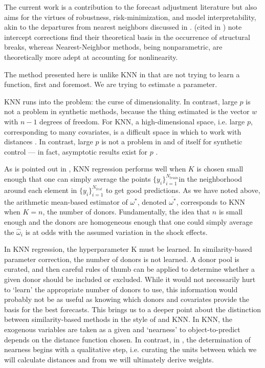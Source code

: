 \documentclass[11pt,3p,review,authoryear]{elsarticle}
\theoremstyle{definition}
\begin{document}
The current work is a contribution to the forecast adjustment literature but also aims for the virtues of robustness, risk-minimization, and model interpretability, akin to the departures from nearest neighbors discussed in \cite{abadie2021penalized}.  \cite{clements1996intercept} (cited in \cite{guerron2017macroeconomic})  note intercept corrections find their theoretical basis in the occurrence of structural breaks, whereas Nearest-Neighbor methods, being nonparametric, are theoretically more adept at accounting for nonlinearity.  

The method presented here is unlike KNN in that are not trying to learn a function, first and foremost.  We are trying to estimate a parameter.

KNN runs into the problem: the curse of dimensionality.  In contrast, large $p$ is not a problem in synthetic methods, because the thing estimated is the vector $w$ with $n-1$ degrees of freedom.  For KNN, a high-dimensional space, i.e. large $p$, corresponding to many covariates, is a difficult space in which to work with distances \citep{hastie2009elements}.  In contrast, large $p$ is not a problem in and of itself for synthetic control --- in fact, asymptotic results exist for $p$ \citep{abadie2010synthetic}.  

As is pointed out in \citet{hastie2009elements}, KNN regression performs well when $K$ is chosen small enough that one can simply average the points $\{y_{i}\}_{i=1}^{N_{train}}$in the neighborhood around each element in $\{y_{i}\}_{i=1}^{N_{test}}$ to get good predictions.  As we have noted above, the arithmetic mean-based estimator of $\omega^{*}$, denoted $\overline{\omega^{*}}$, corresponds to KNN when $K = n$, the number of donors.  Fundamentally, the idea that $n$ is small enough and the donors are homogeneous enough that one could simply average the $\hat\omega_{i}$ is at odds with the assumed variation in the shock effects.

In KNN regression, the hyperparameter K must be learned.  In similarity-based parameter correction, the number of donors is not learned.  A donor pool is curated, and then careful rules of thumb can be applied to determine whether a given donor should be included or excluded.  While it would not necessarily hurt to `learn' the appropriate number of donors to use, this information would probably not be as useful as knowing which donors and covariates provide the basis for the best forecasts.  This brings us to a deeper point about the distinction between similarity-based methods in the style of \citet{lin2021minimizing} and KNN.  In KNN, the exogenous variables are taken as a given and `nearness' to object-to-predict depends on the distance function chosen.  In contrast, in \citet{lin2021minimizing}, the determination of nearness begins with a qualitative step, i.e. curating the units between which we will calculate distances and from we will ultimately derive weights.
\end{document}
